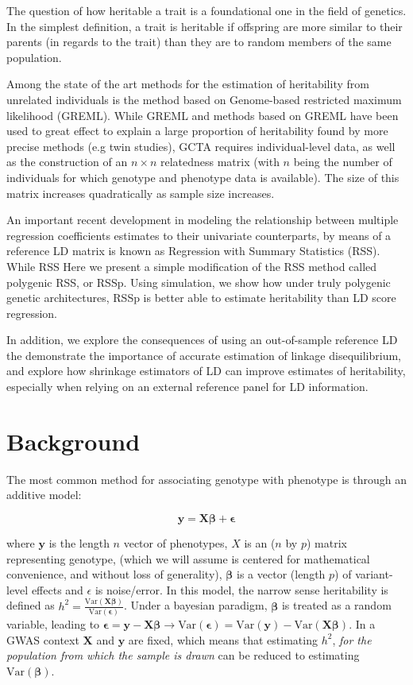 The question of how heritable a trait is a foundational one in the field of genetics. In the simplest definition, a trait is heritable if offspring are more similar to their parents (in regards to the trait) than they are to random members of the same population.  

Among the state of the art methods for the estimation of heritability from unrelated individuals is the method based on Genome-based restricted maximum likelihood (GREML)\cite{GCTA}.  While GREML and methods based on GREML have been used to great effect to explain a large proportion of heritability found by more precise methods (e.g twin studies)\cite{GCTA}, GCTA requires individual-level data, as well as the construction of an $n \times n$ relatedness matrix (with $n$ being the number of individuals for which genotype and phenotype data is available).  The size of this matrix increases quadratically as sample size increases.

An important recent development in modeling the relationship between multiple regression coefficients estimates to their univariate counterparts, by means of a reference LD matrix is known as Regression with Summary Statistics (RSS)\cite{Zhu_2017}.  While RSS Here we present a simple modification of the RSS method called polygenic RSS, or RSSp.  Using simulation, we show how under truly polygenic genetic architectures, RSSp is better able to estimate heritability than LD score regression.

In addition, we explore the consequences of using an out-of-sample reference LD the demonstrate the importance of accurate estimation of linkage disequilibrium, and explore how shrinkage estimators of LD can improve estimates of heritability, especially when relying on an external reference panel for LD information.  

\section{Background}

The most common method for associating genotype with phenotype is through  an additive model:

$$ \textbf{y}= \textbf{X} \boldsymbol{\beta} + \boldsymbol{\epsilon}$$

where $\textbf{y}$ is the length $n$ vector of phenotypes, \(X\) is an (\(n\) by \(p\)) matrix representing genotype, (which we will assume is centered for mathematical convenience, and without loss of generality), \(\boldsymbol{\beta}\) is a vector (length \(p\)) of variant-level effects and \(\epsilon\) is noise/error. In this model, the narrow sense heritability is defined as $h^2=\frac{\text{Var}(\textbf{X}\boldsymbol{\beta})}{\text{Var}(\boldsymbol{\epsilon})}$. Under a bayesian paradigm, $\boldsymbol{\beta}$ is treated as a random variable, leading to  $\boldsymbol{\epsilon} = \textbf{y}-\textbf{X}\boldsymbol{\beta} \rightarrow \text{Var}(\boldsymbol{\epsilon})= \text{Var}(\textbf{y})-\text{Var}(\textbf{X}\boldsymbol{\beta})$.  In a GWAS context $\textbf{X}$ and $\textbf{y}$ are fixed, which means that estimating $h^2$, \emph{for the population from which the sample is drawn} can be reduced to estimating $\text{Var}(\boldsymbol{\beta})$.

